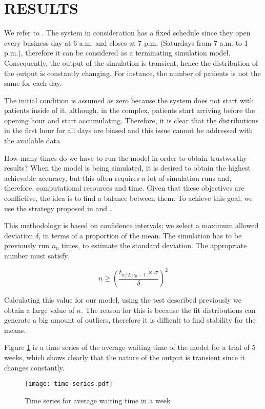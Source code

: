 \section{RESULTS}
We refer to \cite[Ch. 9]{robinson2004simulation}. The system in consideration has a fixed schedule since they open every business day at 6 a.m. and closes at 7 p.m. (Saturdays from 7 a.m. to 1 p.m.), therefore it can be considered as a terminating simulation model. Consequently, the output of the simulation is transient, hence the distribution of the output is constantly changing. For instance, the number of patients is not the same for each day.

The initial condition is assumed as zero because the system does not start with patients inside of it, although, in the complex, patients start arriving before the opening hour and start accumulating. Therefore, it is clear that the distributions in the first hour for all days are biased and this issue cannot be addressed with the available data.

How many times do we have to run the model in order to obtain trustworthy results? When the model is being simulated, it is desired to obtain the highest achievable accuracy, but this often requires a lot of simulation runs and, therefore, computational resources and time. Given that these objectives are conflictive, the idea is to find a balance between them. To achieve this goal, we use the strategy proposed in \cite{byrne2013many} and \cite{currie2016practical}.

This methodology is based on confidence intervals; we select a maximum allowed deviation $\delta$, in terms of a proportion of the mean. The simulation has to be previously run $n_0$ times, to estimate the standard deviation. The appropriate number must satisfy 

\begin{equation}
n \geq\left(\frac{t_{\alpha/2;n_0-1} \times \sigma}{\delta}\right)^{2}
\end{equation} 

Calculating this value for our model, using the test described previously we obtain a large value of $n$. The reason for this is because the fit distributions can generate a big amount of outliers, therefore it is difficult to find stability for the means.

Figure \ref{fig:time_series} is a time series of the average waiting time of the model for a trial of 5 weeks, which shows clearly that the nature of the output is transient since it changes constantly.

\begin{figure}[H]
    \centering
    \texttt{[image: time-series.pdf]}
    \caption{Time series for average waiting time in a week}
    \label{fig:time_series}
\end{figure}
